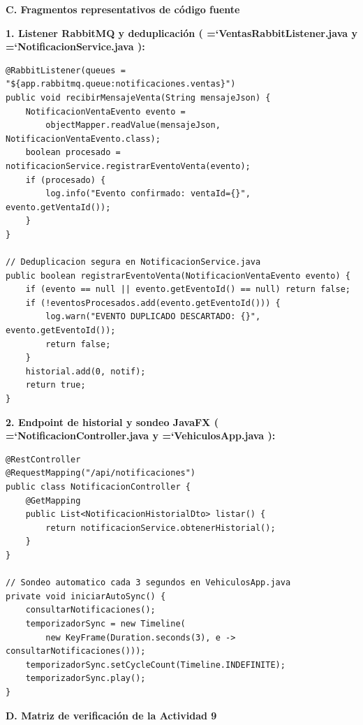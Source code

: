 \documentclass[11pt,a4paper]{article}
\renewcommand{\_}{\oldunderscore\allowbreak}
\DeclareRobustCommand{\texttt}[1]{%
  {\upshape\ttfamily\fontsize{9}{10.8}\selectfont\hyphenchar\font=`\-\relax #1}%
}
\begin{document}
\vspace{0.2cm}
\noindent\textbf{C. Fragmentos representativos de código fuente}

\vspace{0.1cm}
\noindent\textbf{1. Listener RabbitMQ y deduplicación (\texttt{VentasRabbitListener.\allowbreak{}java} y \texttt{NotificacionService.\allowbreak{}java}):}
\begin{lstlisting}
@RabbitListener(queues = "${app.rabbitmq.queue:notificaciones.ventas}")
public void recibirMensajeVenta(String mensajeJson) {
    NotificacionVentaEvento evento =
        objectMapper.readValue(mensajeJson, NotificacionVentaEvento.class);
    boolean procesado = notificacionService.registrarEventoVenta(evento);
    if (procesado) {
        log.info("Evento confirmado: ventaId={}", evento.getVentaId());
    }
}

// Deduplicacion segura en NotificacionService.java
public boolean registrarEventoVenta(NotificacionVentaEvento evento) {
    if (evento == null || evento.getEventoId() == null) return false;
    if (!eventosProcesados.add(evento.getEventoId())) {
        log.warn("EVENTO DUPLICADO DESCARTADO: {}", evento.getEventoId());
        return false;
    }
    historial.add(0, notif);
    return true;
}
\end{lstlisting}

\vspace{0.1cm}
\noindent\textbf{2. Endpoint de historial y sondeo JavaFX (\texttt{NotificacionController.\allowbreak{}java} y \texttt{VehiculosApp.\allowbreak{}java}):}
\begin{lstlisting}
@RestController
@RequestMapping("/api/notificaciones")
public class NotificacionController {
    @GetMapping
    public List<NotificacionHistorialDto> listar() {
        return notificacionService.obtenerHistorial();
    }
}

// Sondeo automatico cada 3 segundos en VehiculosApp.java
private void iniciarAutoSync() {
    consultarNotificaciones();
    temporizadorSync = new Timeline(
        new KeyFrame(Duration.seconds(3), e -> consultarNotificaciones()));
    temporizadorSync.setCycleCount(Timeline.INDEFINITE);
    temporizadorSync.play();
}
\end{lstlisting}

\vspace{0.2cm}
\noindent\textbf{D. Matriz de verificación de la Actividad 9}
\end{document}
